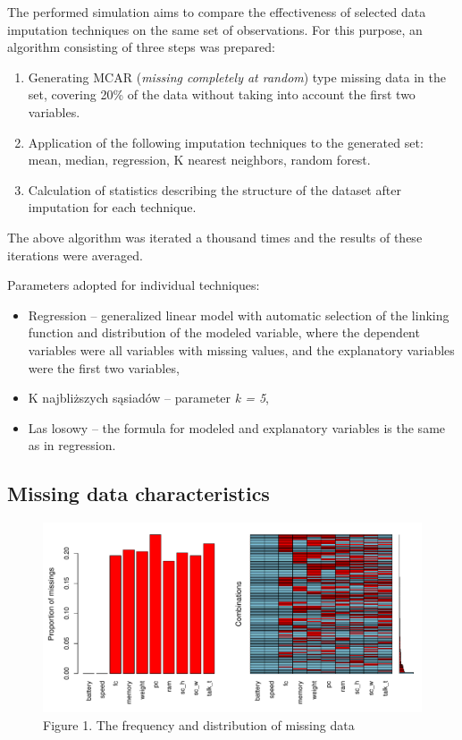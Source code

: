 \documentclass[
  11pt,
]{article}
\providecommand{\tightlist}{%
  \setlength{\itemsep}{0pt}\setlength{\parskip}{0pt}}
\begin{document}
The performed simulation aims to compare the effectiveness of selected data imputation techniques on the same set of observations. For this purpose, an algorithm consisting of three steps was prepared:

\begin{enumerate}
\def\labelenumi{\arabic{enumi}.}
\tightlist
\item
  Generating MCAR (\emph{missing completely at random}) type missing data in the set, covering 20\% of the data without taking into account the first two variables.
\item
  Application of the following imputation techniques to the generated set: mean, median, regression, K nearest neighbors, random forest.
\item
  Calculation of statistics describing the structure of the dataset after imputation for each technique.
\end{enumerate}

The above algorithm was iterated a thousand times and the results of these iterations were averaged.

Parameters adopted for individual techniques:

\begin{itemize}
\tightlist
\item
  Regression -- generalized linear model with automatic selection of the linking function and distribution of the modeled variable, where the dependent variables were all variables with missing values, and the explanatory variables were the first two variables,
\item
  K najbliższych sąsiadów -- parameter \emph{k = 5},
\item
  Las losowy -- the formula for modeled and explanatory variables is the same as in regression.
\end{itemize}

\hypertarget{missing-data-characteristics}{%
\subsection{Missing data characteristics}\label{missing-data-characteristics}}

\begin{figure}

{\centering \includegraphics{report_files/figure-latex/unnamed-chunk-1-1} 

}

\caption{Figure 1. The frequency and distribution of missing data}\label{fig:unnamed-chunk-1}
\end{figure}
\end{document}
